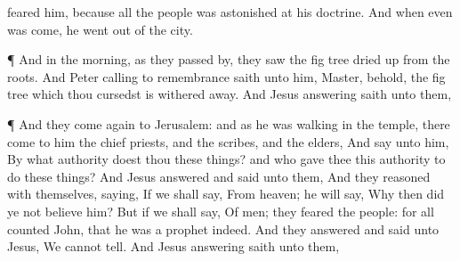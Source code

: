{feared
him,
because
all the
people was
astonished
at
his
doctrine.
And
when
even was
come, he
went out
of the
city.
\par }{\PP {}¶
And in the
morning, as they passed
by, they
saw the fig
tree dried
up
from the
roots.
And
Peter calling to
remembrance
saith unto
him,
Master,
behold, the fig
tree
which thou
cursedst is withered
away.
And
Jesus
answering
saith unto
them,
{}
\par }{\PP {}¶
And they
come
again
to
Jerusalem:
and as
he was
walking
in the
temple, there
come
to
him the chief
priests,
and the
scribes,
and the
elders,
And
say unto
him,
By
what
authority doest
thou these
things?
and
who
gave
thee
this
authority
to
do these
things?
And
Jesus
answered and
said unto
them,
{}
And they
reasoned
with
themselves,
saying,
If we shall
say,
From
heaven; he will
say,
Why
then did
ye
not
believe
him?
But
if we shall
say,
Of
men; they
feared the
people:
for
all
{}
counted
John,
that he
was a
prophet
indeed.
And they
answered and
said unto
Jesus,
We
cannot
tell.
And
Jesus
answering
saith unto
them,
{}

}
